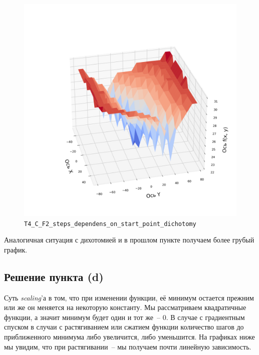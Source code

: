 \documentclass[12pt, a4paper, oneside, final]{article}
\begin{document}
	\begin{figure}[H]
		\centering
		\includegraphics[scale=0.68]{Image/T4_C_F2_steps_dependens_on_start_point_dichotomy.png}
		\caption*{\texttt{T4\_C\_F2\_steps\_dependens\_on\_start\_point\_dichotomy}}
	\end{figure}
	Аналогичная ситуация с дихотомией и в прошлом пункте получаем более грубый график.
	\subsection*{Решение пункта (d)}
	Суть \textit{scaling}'а в том, что при изменении функции, её минимум остается прежним или же он меняется на некоторую константу. Мы рассматриваем квадратичные функции, а значит минимум будет один и тот же~-- $0$. В случае с градиентным спуском в случаи с растягиванием или сжатием функции количество шагов до приближенного минимума либо увеличится, либо уменьшится.
	На графиках ниже мы увидим, что при растягивании~-- мы получаем почти линейную зависимость.
\end{document}
